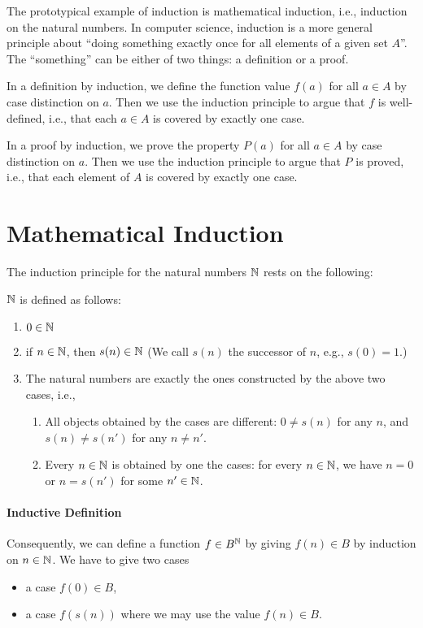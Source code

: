 The prototypical example of induction is mathematical induction, i.e., induction on the natural numbers.
In computer science, induction is a more general principle about ``doing something exactly once for all elements of a given set $A$''.
The ``something'' can be either of two things: a definition or a proof.

In a definition by induction, we define the function value $f(a)$ for all $a\in A$ by case distinction on $a$.
Then we use the induction principle to argue that $f$ is well-defined, i.e., that each $a\in A$ is covered by exactly one case.

In a proof by induction, we prove the property $P(a)$ for all $a\in A$ by case distinction on $a$.
Then we use the induction principle to argue that $P$ is proved, i.e., that each element of $A$ is covered by exactly one case.

\section{Mathematical Induction}\label{sec:induction:math}

The induction principle for the natural numbers $\mathbb{N}$ rests on the following:

\begin{definition}\label{def:nat}
$\mathbb{N}$ is defined as follows:
\begin{enumerate}
  \item\label{def:nat:zero} $0\in \mathbb{N}$
  \item\label{def:nat:succ} if $n\in \mathbb{N}$, then $s(n)\in \mathbb{N}$ (We call $s(n)$ the successor of $n$, e.g., $s(0)=1$.)
  \item The natural numbers are exactly the ones constructed by the above two cases, i.e.,
    \begin{enumerate}
      \item\label{def:nat:consistent} All objects obtained by the cases are different: $0\neq s(n)$ for any $n$, and $s(n)\neq s(n')$ for any $n\neq n'$.
      \item\label{def:nat:coverage} Every $n\in\mathbb{N}$ is obtained by one the cases: for every $n\in\mathbb{N}$, we have $n=0$ or $n=s(n')$ for some $n'\in \mathbb{N}$.
   \end{enumerate}
\end{enumerate}
\end{definition}

\paragraph{Inductive Definition}
Consequently, we can define a function $f\in B^{\mathbb{N}}$ by giving $f(n)\in B$ by induction on $n\in\mathbb{N}$.
We have to give two cases
 \begin{itemize}
   \item a case $f(0)\in B$,
   \item a case $f(s(n))$ where we may use the value $f(n)\in B$.
 \end{itemize}

